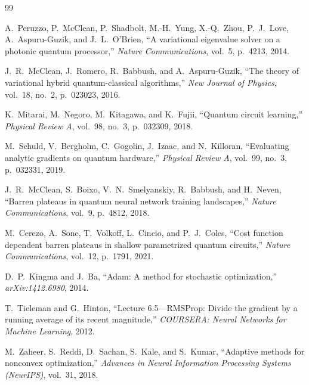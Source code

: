 \documentclass[11pt,a4paper]{article}
\begin{document}
\begin{thebibliography}{99}

A.~Peruzzo, P.~McClean, P.~Shadbolt, M.-H.~Yung, X.-Q.~Zhou, P.~J.~Love, A.~Aspuru-Guzik, and J.~L.~O'Brien,
\newblock ``A variational eigenvalue solver on a photonic quantum processor,''
\newblock \emph{Nature Communications}, vol.~5, p.~4213, 2014.

J.~R.~McClean, J.~Romero, R.~Babbush, and A.~Aspuru-Guzik,
\newblock ``The theory of variational hybrid quantum-classical algorithms,''
\newblock \emph{New Journal of Physics}, vol.~18, no.~2, p.~023023, 2016.

K.~Mitarai, M.~Negoro, M.~Kitagawa, and K.~Fujii,
\newblock ``Quantum circuit learning,''
\newblock \emph{Physical Review A}, vol.~98, no.~3, p.~032309, 2018.

M.~Schuld, V.~Bergholm, C.~Gogolin, J.~Izaac, and N.~Killoran,
\newblock ``Evaluating analytic gradients on quantum hardware,''
\newblock \emph{Physical Review A}, vol.~99, no.~3, p.~032331, 2019.

J.~R.~McClean, S.~Boixo, V.~N.~Smelyanskiy, R.~Babbush, and H.~Neven,
\newblock ``Barren plateaus in quantum neural network training landscapes,''
\newblock \emph{Nature Communications}, vol.~9, p.~4812, 2018.

M.~Cerezo, A.~Sone, T.~Volkoff, L.~Cincio, and P.~J.~Coles,
\newblock ``Cost function dependent barren plateaus in shallow parametrized quantum circuits,''
\newblock \emph{Nature Communications}, vol.~12, p.~1791, 2021.

D.~P.~Kingma and J.~Ba,
\newblock ``Adam: A method for stochastic optimization,''
\newblock \emph{arXiv:1412.6980}, 2014.

T.~Tieleman and G.~Hinton,
\newblock ``Lecture 6.5---RMSProp: Divide the gradient by a running average of its recent magnitude,''
\newblock \emph{COURSERA: Neural Networks for Machine Learning}, 2012.

M.~Zaheer, S.~Reddi, D.~Sachan, S.~Kale, and S.~Kumar,
\newblock ``Adaptive methods for nonconvex optimization,''
\newblock \emph{Advances in Neural Information Processing Systems (NeurIPS)}, vol.~31, 2018.


\end{thebibliography}
\end{document}
